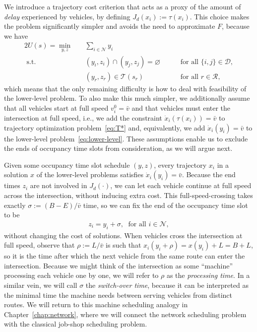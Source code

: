 \documentclass[a4paper]{report}
\theoremstyle{definition}
\theoremstyle{plain}
\begin{document}
We introduce a trajectory cost criterion that acts as a proxy of the amount of
\emph{delay} experienced by vehicles, by defining $J_d(x_{i}) := \tau(x_{i})$.
%
This choice makes the problem significantly simpler and avoids the need to
approximate $F$, because we have
\begin{alignat}{2}
  U(s) = \min_{y, z} \quad & \sum_{i \in \mathcal{N}} y_{i} \nonumber \\
  \text{ s.t. } \quad & (y_{i},z_{i}) \cap (y_{j},z_{j}) = \varnothing && \quad \text{ for all } \{i, j\} \in \mathcal{D} , \nonumber \\
                           & ({y}_{r}, {z}_{r}) \in \mathcal{T}(s_{r}) && \quad \text{ for all } r \in \mathcal{R} , \nonumber
\end{alignat}
which means that the only remaining difficulty is how to deal with feasibility
of the lower-level problem.
%
To also make this much simpler, we additionally assume that all vehicles start
at full speed $v_{i}^{0} = \bar{v}$ and that vehicles must enter the
intersection at full speed, i.e., we add the constraint
$\dot{x}_{i}(\tau(x_{i})) = \bar{v}$ to trajectory optimization problem~\eqref{eq:T*} and,
equivalently, we add $\dot{x}_{i}(y_{i}) = \bar{v}$ to the lower-level
problem~\eqref{eq:lower-level}.
%
These assumptions enable us to exclude the ends of occupancy time slots from
consideration, as we will argue next.

Given some occupancy time slot schedule $(y,z)$, every trajectory $x_{i}$ in a
solution $x$ of the lower-level problems satisfies
$\dot{x}_{i}(y_{i}) = \bar{v}$.
%
Because the end times $z_{i}$ are not involved in $J_d(\cdot)$, we can let each
vehicle continue at full speed across the intersection, without inducing extra
cost. This full-speed-crossing takes exactly $\sigma := (B-E)/\bar{v}$ time, so we
can fix the end of the occupancy time slot to be
\begin{align*}
  z_{i} = y_{i} + \sigma, \; \text{ for all } i \in \mathcal{N} ,
\end{align*}
without changing the cost of solutions.
%
When vehicles cross the intersection at full speed, observe that
$\rho := L / \bar{v}$ is such that $x_{i}(y_i + \rho) = x(y_{i}) + L = B + L$, so it
is the time after which the next vehicle from the same route can enter the
intersection. Because we might think of the intersection as some ``machine''
processing each vehicle one by one, we will refer to $\rho$ as the \textit{processing time}.
%
In a similar vein, we will call $\sigma$ the \emph{switch-over time}, because it
can be interpreted as the minimal time the machine needs between serving
vehicles from distinct routes.
%
We will return to this machine scheduling analogy in Chapter~\ref{chap:network},
where we will connect the network scheduling problem with the classical job-shop
scheduling problem.
\end{document}
